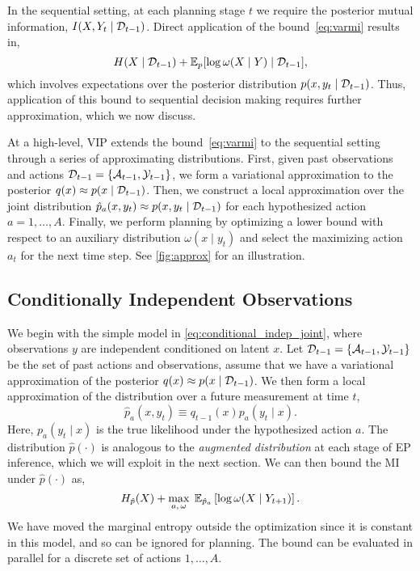 
In the sequential setting, at each planning stage $t$ we require the
posterior mutual information, ${I(X,Y_t\mid \mathcal{D}_{t-1})}$.  Direct application of the
bound~\eqref{eq:varmi} results in,
\[
  H(X\mid \mathcal{D}_{t-1}) + \mathbb{E}_p[ \log \omega(X\mid Y) \mid \mathcal{D}_{t-1}],
\]
which involves expectations over the posterior distribution ${p(x,y_t
  \mid \mathcal{D}_{t-1})}$.  Thus, application of this bound to sequential
decision making requires further approximation, which we now discuss.

At a high-level, VIP extends the bound~\eqref{eq:varmi} to the
sequential setting through a series of approximating distributions.
First, given past observations and actions $\mathcal{D}_{t-1} =
\{\mathcal{A}_{t-1}, \mathcal{Y}_{t-1}\}$, we form a variational approximation to
the posterior \mbox{$q(x)\approx p(x\mid \mathcal{D}_{t-1})$}.  Then, we
construct a local approximation over the joint distribution
\mbox{$\hat{p}_a(x,y_t) \approx p(x,y_t\mid \mathcal{D}_{t-1})$} for each
hypothesized action $a=1,\ldots,A$.  Finally, we perform planning by
optimizing a lower bound with respect to an auxiliary
  distribution $\omega(x\mid y_t)$ and select the maximizing action
$a_t$ for the next time step.  See \FIG\ref{fig:approx} for an
illustration.

\subsection{Conditionally Independent Observations}

We begin with the simple model in
\EQN\ref{eq:conditional_indep_joint}, where observations $y$ are
independent conditioned on latent $x$.  Let $\mathcal{D}_{t-1} =
\{\mathcal{A}_{t-1}, \mathcal{Y}_{t-1}\}$ be the set of past actions and
observations, assume that we have a variational approximation of the
posterior \mbox{$q(x) \approx p(x \mid \mathcal{D}_{t-1})$}.  We then form a
local approximation of the distribution over a future measurement at
time $t$,
\begin{equation}\label{eq:local_approx}
  \hat{p}_{a}(x,y_t) \equiv q_{t-1}(x) p_{a}(y_t \mid x).
\end{equation}
Here, $p_{a}(y_t \mid x)$ is the true likelihood under the
hypothesized action $a$.  The distribution $\hat{p}(\cdot)$ is
analogous to the \emph{augmented distribution} at each stage of EP
inference, which we will exploit in the next section.  We can then
bound the MI under $\hat{p}(\cdot)$ as,
\begin{equation}\label{eq:varmi_approx}
  H_{\hat{p}}(X) + \max_{a, \,\omega}  \;\mathbb{E}_{\hat{p}_a}\left[ \log \omega(X \mid Y_{t+1})
  \right].
\end{equation}
We have moved the marginal entropy outside the optimization since it is
constant in this model, and so can be ignored for planning.  The bound
can be evaluated in parallel for a discrete set of actions
$1,\ldots,A$.

